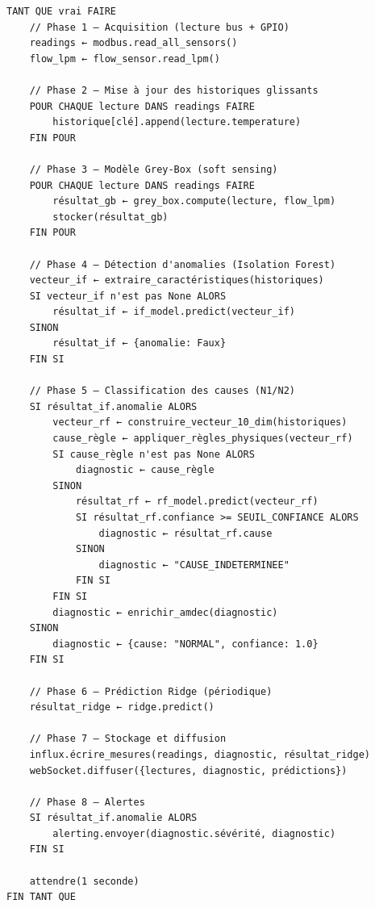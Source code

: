 \begin{algorithm}[htbp]
\caption{Pipeline principal d'acquisition et de diagnostic}
\label{alg:pipeline}
\begin{minipage}{0.96\textwidth}
\footnotesize
\setlength{\baselineskip}{9.8pt}
\begin{verbatim}
TANT QUE vrai FAIRE
    // Phase 1 — Acquisition (lecture bus + GPIO)
    readings ← modbus.read_all_sensors()
    flow_lpm ← flow_sensor.read_lpm()
    
    // Phase 2 — Mise à jour des historiques glissants
    POUR CHAQUE lecture DANS readings FAIRE
        historique[clé].append(lecture.temperature)
    FIN POUR
    
    // Phase 3 — Modèle Grey-Box (soft sensing)
    POUR CHAQUE lecture DANS readings FAIRE
        résultat_gb ← grey_box.compute(lecture, flow_lpm)
        stocker(résultat_gb)
    FIN POUR
    
    // Phase 4 — Détection d'anomalies (Isolation Forest)
    vecteur_if ← extraire_caractéristiques(historiques)
    SI vecteur_if n'est pas None ALORS
        résultat_if ← if_model.predict(vecteur_if)
    SINON
        résultat_if ← {anomalie: Faux}
    FIN SI
    
    // Phase 5 — Classification des causes (N1/N2)
    SI résultat_if.anomalie ALORS
        vecteur_rf ← construire_vecteur_10_dim(historiques)
        cause_règle ← appliquer_règles_physiques(vecteur_rf)
        SI cause_règle n'est pas None ALORS
            diagnostic ← cause_règle
        SINON
            résultat_rf ← rf_model.predict(vecteur_rf)
            SI résultat_rf.confiance >= SEUIL_CONFIANCE ALORS
                diagnostic ← résultat_rf.cause
            SINON
                diagnostic ← "CAUSE_INDETERMINEE"
            FIN SI
        FIN SI
        diagnostic ← enrichir_amdec(diagnostic)
    SINON
        diagnostic ← {cause: "NORMAL", confiance: 1.0}
    FIN SI
    
    // Phase 6 — Prédiction Ridge (périodique)
    résultat_ridge ← ridge.predict()
    
    // Phase 7 — Stockage et diffusion
    influx.écrire_mesures(readings, diagnostic, résultat_ridge)
    webSocket.diffuser({lectures, diagnostic, prédictions})
    
    // Phase 8 — Alertes
    SI résultat_if.anomalie ALORS
        alerting.envoyer(diagnostic.sévérité, diagnostic)
    FIN SI
    
    attendre(1 seconde)
FIN TANT QUE
\end{verbatim}
\end{minipage}
\end{algorithm}

